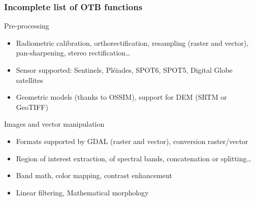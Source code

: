 \documentclass[smaller]{beamer}
\begin{document}
\begin{frame}
\frametitle{Incomplete list of OTB functions}

\begin{block}{Pre-processing}
\begin{itemize}
\item Radiometric calibration, orthorectification, resampling (raster and
  vector), pan-sharpening, stereo rectification\ldots
\item Sensor supported: Sentinels, Pléiades, SPOT6, SPOT5, Digital Globe satellites
\item Geometric models (thanks to OSSIM), support for DEM (SRTM or GeoTIFF)
\end{itemize}
\end{block}

\begin{block}{Images and vector manipulation}
\begin{itemize}
\item Formats supported by GDAL (raster and vector), conversion raster/vector
\item Region of interest extraction, of spectral bands, concatenation or splitting\ldots
\item Band math, color mapping, contrast enhancement
\item Linear filtering, Mathematical morphology
\end{itemize}
\end{block}
\end{frame}
\end{document}
